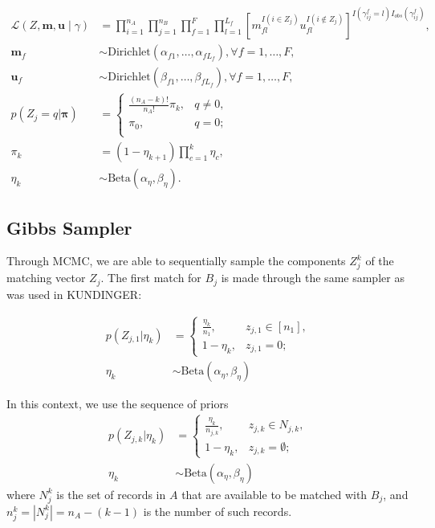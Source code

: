 \documentclass[12pt,letterpaper]{article}
\newcommand{\1}[1]{\mathbb{I}\!\left[#1\right]} %
\begin{document}
\begin{subequations}
	\begin{align}
		\mathcal{L}(Z, \bm{m}, \bm{u} \mid \gamma) &= \prod_{i=1}^{n_A}  \prod_{j=1}^{n_B}\prod_{f=1}^{F}\prod_{l=1}^{L_f}\left[  m_{fl}^{I(i \in Z_j)}u_{fl}^{I(i \notin Z_j)}\right]^{I(\gamma_{ij}^f = l)I_{obs}(\gamma_{ij}^f)}, \label{eqn:likelihood}\\
		\bm{m}_f &\sim \text{Dirichlet}(\alpha_{f1}, \ldots, \alpha_{f L_f}), \forall f = 1, \ldots, F, \label{eqn:m} \\
		\bm{u}_f &\sim \text{Dirichlet}(\beta_{f1}, \ldots, \beta_{f L_f}),\forall f = 1, \ldots, F,  \label{eqn:u}\\
		p(Z_j = q| \bm{\pi})  &=
		\begin{cases} 
			\frac{(n_A - k)!}{n_A!} \pi_k,  & q \neq 0, \\
			\pi_0, &  q  = 0; \\
		\end{cases} \label{eqn:z}\\
		\pi_k &= (1 - \eta_{k+1}) \prod_{c=1}^{k} \eta_c,  \\
		\eta_k &\sim \text{Beta}(\alpha_{\eta}, \beta_{\eta})\label{eqn:pi}.
	\end{align}
\end{subequations}



\subsection{Gibbs Sampler}
Through MCMC, we are able to sequentially sample the components $Z_j^k$ of the matching vector $Z_j$. The first match for $B_j$ is made through the same sampler as was used in KUNDINGER:

\begin{align}
	p(Z_{j, 1}|\eta_k) &= \begin{cases}
		\frac{\eta_k}{n_1}, &  z_{j, 1} \in [n_1], \\
		1 - \eta_k, & z_{j, 1} = 0;
	\end{cases} \\
	\eta_k &\sim \text{Beta}(\alpha_{\eta}, \beta_{\eta})
\end{align}



In this context, we use the sequence of priors
\begin{align}
	p(Z_{j, k}|\eta_k) &= \begin{cases}
		\frac{\eta_k}{n_{j, k}}, &  z_{j, k} \in N_{j, k}, \\
		1 - \eta_k, & z_{j, k} = \emptyset;
		\end{cases} \\
	\eta_k &\sim \text{Beta}(\alpha_{\eta}, \beta_{\eta})
\end{align}
where $N_j^k$ is the set of records in $A$ that are available to be matched with $B_j$, and $n_j^k = |N_j^k| = n_A - (k - 1)$ is the number of such records. 
\end{document}
